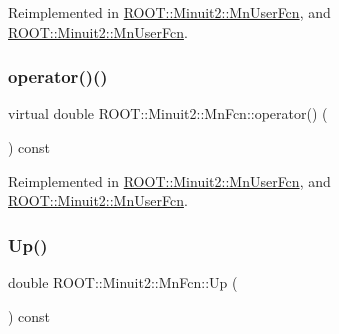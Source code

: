 Reimplemented in \mbox{\hyperlink{classROOT_1_1Minuit2_1_1MnUserFcn_a7f25ae05f1caca57bd8d1e83b9643dfe}{R\+O\+O\+T\+::\+Minuit2\+::\+Mn\+User\+Fcn}}, and \mbox{\hyperlink{classROOT_1_1Minuit2_1_1MnUserFcn_aad007634c740a70ebb8f5acb0a7cfede}{R\+O\+O\+T\+::\+Minuit2\+::\+Mn\+User\+Fcn}}.

\mbox{\label{classROOT_1_1Minuit2_1_1MnFcn_ad981818a8e3bba0ec2cb0300238a5610}} 
\subsubsection{\texorpdfstring{operator()()}{operator()()}\hspace{0.1cm}{\footnotesize\ttfamily [2/2]}}
{\footnotesize\ttfamily virtual double R\+O\+O\+T\+::\+Minuit2\+::\+Mn\+Fcn\+::operator() (\begin{DoxyParamCaption}\item[{const \mbox{\hyperlink{namespaceROOT_1_1Minuit2_a62ed97730a1ca8d3fbaec64a19aa11c9}{Mn\+Algebraic\+Vector}} \&}]{ }\end{DoxyParamCaption}) const\hspace{0.3cm}{\ttfamily [virtual]}}



Reimplemented in \mbox{\hyperlink{classROOT_1_1Minuit2_1_1MnUserFcn_a7f25ae05f1caca57bd8d1e83b9643dfe}{R\+O\+O\+T\+::\+Minuit2\+::\+Mn\+User\+Fcn}}, and \mbox{\hyperlink{classROOT_1_1Minuit2_1_1MnUserFcn_aad007634c740a70ebb8f5acb0a7cfede}{R\+O\+O\+T\+::\+Minuit2\+::\+Mn\+User\+Fcn}}.

\mbox{\label{classROOT_1_1Minuit2_1_1MnFcn_a2c91d0dd77e9c913116fb84b6fe31633}} 
\subsubsection{\texorpdfstring{Up()}{Up()}\hspace{0.1cm}{\footnotesize\ttfamily [1/2]}}
{\footnotesize\ttfamily double R\+O\+O\+T\+::\+Minuit2\+::\+Mn\+Fcn\+::\+Up (\begin{DoxyParamCaption}{ }\end{DoxyParamCaption}) const}

